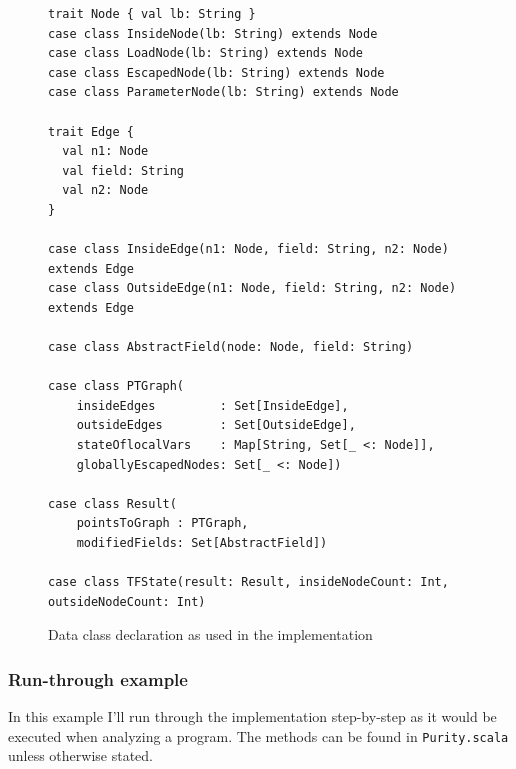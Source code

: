 \documentclass[11pt]{exam}
\begin{document}
\begin{figure}[t]
\begin{lstlisting}
trait Node { val lb: String }
case class InsideNode(lb: String) extends Node
case class LoadNode(lb: String) extends Node
case class EscapedNode(lb: String) extends Node
case class ParameterNode(lb: String) extends Node

trait Edge {
  val n1: Node
  val field: String
  val n2: Node
}

case class InsideEdge(n1: Node, field: String, n2: Node) extends Edge
case class OutsideEdge(n1: Node, field: String, n2: Node) extends Edge

case class AbstractField(node: Node, field: String)

case class PTGraph(
    insideEdges         : Set[InsideEdge],
    outsideEdges        : Set[OutsideEdge],
    stateOflocalVars    : Map[String, Set[_ <: Node]],
    globallyEscapedNodes: Set[_ <: Node])

case class Result(
    pointsToGraph : PTGraph,
    modifiedFields: Set[AbstractField])

case class TFState(result: Result, insideNodeCount: Int, outsideNodeCount: Int)
\end{lstlisting}
\caption{Data class declaration as used in the implementation}
\label{code-data}
\end{figure}

\subsubsection*{Run-through example}

In this example I'll run through the implementation step-by-step as it
would be executed when analyzing a program. The methods can be found
in \texttt{Purity.scala} unless otherwise stated. \newline
\end{document}
